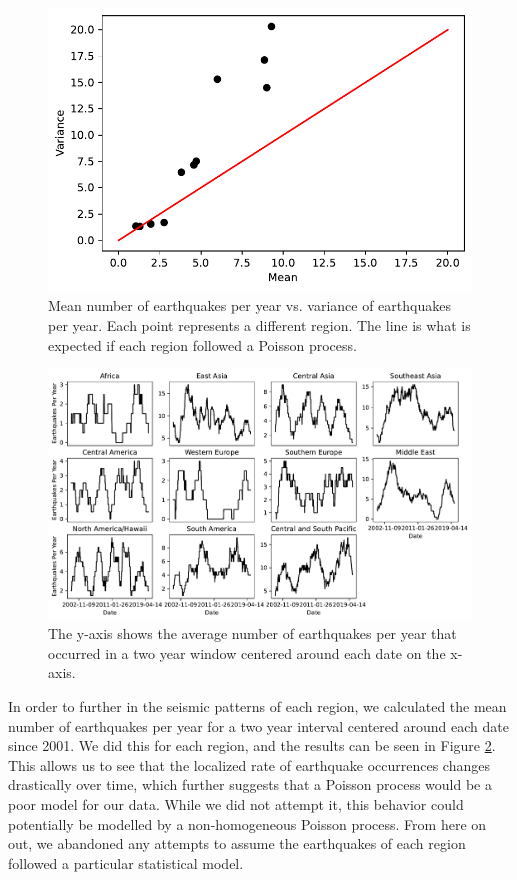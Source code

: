 \documentclass{article}
\begin{document}
\begin{figure}
\centering
\includegraphics[scale=0.5]{mean_v_var.pdf}
\caption{Mean number of earthquakes per year vs. variance of earthquakes per year. Each point represents a different region. The line is what is expected if each region followed a Poisson process.}
\label{mean_v_var}
\end{figure}

\begin{figure}
\centering
\includegraphics[scale=0.5]{localizedRates.pdf}
\caption{The y-axis shows the average number of earthquakes per year that occurred in a two year window centered around each date on the x-axis.}
\label{localizedRates}
\end{figure}

In order to further in the seismic patterns of each region, we calculated the mean number of earthquakes per year for a two year interval centered around each date since 2001. We did this for each region, and the results can be seen in Figure \ref{localizedRates}. This allows us to see that the localized rate of earthquake occurrences changes drastically over time, which further suggests that a Poisson process would be a poor model for our data. While we did not attempt it, this behavior could potentially be modelled by a non-homogeneous Poisson process. From here on out, we abandoned any attempts to assume the earthquakes of each region followed a particular statistical model.
\end{document}
